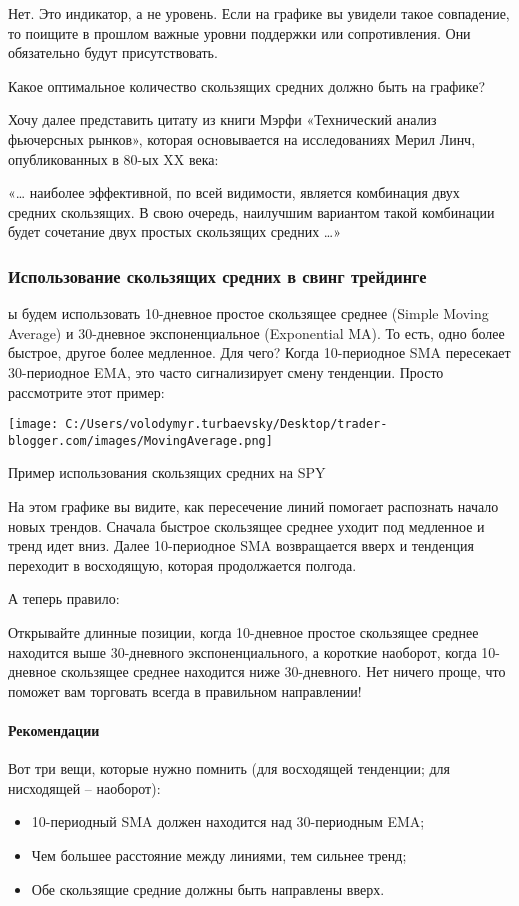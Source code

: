 \documentclass[a5paper]{article}
\begin{document}
Нет. Это индикатор, а не уровень. Если на графике вы увидели такое совпадение, то поищите в прошлом важные уровни поддержки или сопротивления. Они обязательно будут присутствовать.

Какое оптимальное количество скользящих средних должно быть на графике?

Хочу далее представить цитату из книги Мэрфи «Технический анализ фьючерсных рынков», которая основывается на исследованиях Мерил Линч, опубликованных в 80-ых XX века:

    «… наиболее эффективной, по всей видимости, является комбинация
    двух средних скользящих. В свою очередь, наилучшим вариантом такой
    комбинации будет сочетание двух простых скользящих средних …»

\subsubsection{Использование скользящих средних в свинг трейдинге }

ы будем использовать 10-дневное простое скользящее среднее  (Simple Moving Average) и 30-дневное экспоненциальное (Exponential MA). То есть, одно более быстрое, другое более медленное. Для чего? Когда 10-периодное SMA пересекает 30-периодное EMA, это часто сигнализирует смену тенденции. Просто рассмотрите этот пример:

\texttt{[image: C:/Users/volodymyr.turbaevsky/Desktop/trader-blogger.com/images/MovingAverage.png]}

Пример использования скользящих средних на SPY

На этом графике вы видите, как пересечение линий помогает распознать начало новых трендов. Сначала быстрое скользящее среднее уходит под медленное и тренд идет вниз. Далее 10-периодное SMA возвращается вверх и тенденция переходит в восходящую, которая продолжается полгода.

А теперь правило:

Открывайте длинные позиции, когда 10-дневное простое скользящее
среднее находится выше 30-дневного экспоненциального, а короткие
наоборот, когда 10-дневное скользящее среднее находится ниже
30-дневного. Нет ничего проще, что поможет вам торговать всегда в
правильном направлении!

\paragraph{Рекомендации}

Вот три вещи, которые нужно помнить (для восходящей тенденции; для нисходящей – наоборот):
\begin{itemize}
\item     10-периодный SMA должен находится над 30-периодным EMA;
\item     Чем большее расстояние между линиями, тем сильнее тренд;
\item     Обе скользящие средние должны быть направлены вверх.
\end{itemize}
\end{document}
